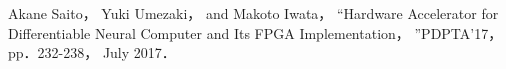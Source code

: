 \documentclass[a4j]{jarticle}
\begin{document}
\begin{Abstract}
\begin{thebibliography}{99}
  Akane Saito， Yuki Umezaki， and Makoto Iwata，
  ``Hardware Accelerator for Differentiable Neural Computer and Its FPGA Implementation，
  ''PDPTA'17， pp．232-238， July 2017．
\end{thebibliography}

\end{Abstract}
\end{document}
